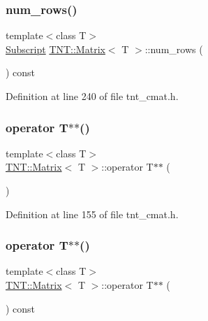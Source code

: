 \subsubsection{\texorpdfstring{num\+\_\+rows()}{num\_rows()}}
{\footnotesize\ttfamily template$<$class T$>$ \\
\hyperlink{namespaceTNT_af22e3f1460e145c04ce4e7d701e4c1c1}{Subscript} \hyperlink{classTNT_1_1Matrix}{T\+N\+T\+::\+Matrix}$<$ T $>$\+::num\+\_\+rows (\begin{DoxyParamCaption}{ }\end{DoxyParamCaption}) const\hspace{0.3cm}{\ttfamily [inline]}}



Definition at line 240 of file tnt\+\_\+cmat.\+h.

\mbox{\label{classTNT_1_1Matrix_a8d5e0a7494b3e4a1a1474eebbe39001c}} 
\subsubsection{\texorpdfstring{operator T$\ast$$\ast$()}{operator T**()}\hspace{0.1cm}{\footnotesize\ttfamily [1/2]}}
{\footnotesize\ttfamily template$<$class T$>$ \\
\hyperlink{classTNT_1_1Matrix}{T\+N\+T\+::\+Matrix}$<$ T $>$\+::operator T$\ast$$\ast$ (\begin{DoxyParamCaption}{ }\end{DoxyParamCaption})\hspace{0.3cm}{\ttfamily [inline]}}



Definition at line 155 of file tnt\+\_\+cmat.\+h.

\mbox{\label{classTNT_1_1Matrix_a13deaf0c2cbe7d1d6cc045d67890b154}} 
\subsubsection{\texorpdfstring{operator T$\ast$$\ast$()}{operator T**()}\hspace{0.1cm}{\footnotesize\ttfamily [2/2]}}
{\footnotesize\ttfamily template$<$class T$>$ \\
\hyperlink{classTNT_1_1Matrix}{T\+N\+T\+::\+Matrix}$<$ T $>$\+::operator T$\ast$$\ast$ (\begin{DoxyParamCaption}{ }\end{DoxyParamCaption}) const\hspace{0.3cm}{\ttfamily [inline]}}



